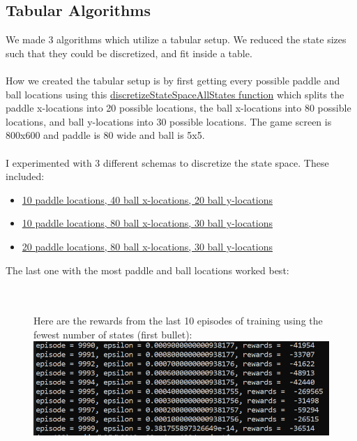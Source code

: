 \documentclass[twoside,11pt]{article}
\begin{document}
\subsection{Tabular Algorithms}
We made 3 algorithms which utilize a tabular setup. We reduced the state sizes such that they could be discretized, and fit inside a table.
\\\\
How we created the tabular setup is by first getting every possible paddle and ball locations
using this \href{https://github.com/duoduocai-dot/csc498-project/blob/main/tabular_Q_learning.py#L223}{discretizeStateSpaceAllStates function} which splits the paddle x-locations into 20 possible locations, the ball x-locations into 80 possible locations, and ball y-locations into 30 possible locations. The game screen is 800x600 and paddle is 80 wide and ball is 5x5.
\\\\
I experimented with 3 different schemas to discretize the state space. These included:
\begin{itemize}
\item \href{https://github.com/duoduocai-dot/csc498-project/blob/main/tabular_Q_learning.py#L180}{10 paddle locations, 40 ball x-locations, 20 ball y-locations}
\item \href{https://github.com/duoduocai-dot/csc498-project/blob/main/tabular_Q_learning.py#L203}{10 paddle locations, 80 ball x-locations, 30 ball y-locations}
\item \href{https://github.com/duoduocai-dot/csc498-project/blob/main/tabular_Q_learning.py#L223}{20 paddle locations, 80 ball x-locations, 30 ball y-locations}
\end{itemize}
The last one with the most paddle and ball locations worked best:\\\\\\
\begin{figure}[h]
Here are the rewards from the last 10 episodes of training using the fewest number of states (first bullet):\\
\includegraphics[scale=0.5]{rewards_last_10_episodes_fewest_number_states}
\centering
\end{figure}
\end{document}
